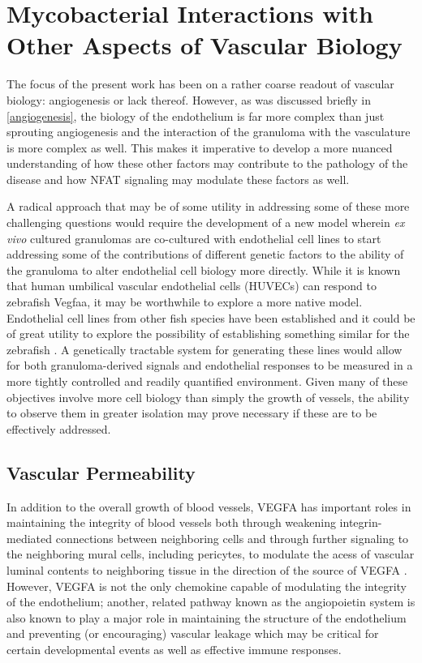 \section{Mycobacterial Interactions with Other Aspects of Vascular Biology}\label{othervasc}

The focus of the present work has been on a rather coarse readout of vascular biology: angiogenesis or lack thereof. However, as was discussed briefly in \autoref{angiogenesis}, the biology of the endothelium is far more complex than just sprouting angiogenesis and the interaction of the granuloma with the vasculature is more complex as well. This makes it imperative to develop a more nuanced understanding of how these other factors may contribute to the pathology of the disease and how NFAT signaling may modulate these factors as well. 

A radical approach that may be of some utility in addressing some of these more challenging questions would require the development of a new model wherein \textit{ex vivo} cultured granulomas are co\hyp{}cultured with endothelial cell lines to start addressing some of the contributions of different genetic factors to the ability of the granuloma to alter endothelial cell biology more directly. While it is known that human umbilical vascular endothelial cells (HUVECs) can respond to zebrafish Vegfaa, it may be worthwhile to explore a more native model. Endothelial cell lines from other fish species have been established and it could be of great utility to explore the possibility of establishing something similar for the zebrafish \citep{Pham2017, Luque2014}. A genetically tractable system for generating these lines would allow for both granuloma\hyp{}derived signals and endothelial responses to be measured in a more tightly controlled and readily quantified environment. Given many of these objectives involve more cell biology than simply the growth of vessels, the ability to observe them in greater isolation may prove necessary if these are to be effectively addressed.

\subsection{Vascular Permeability}\label{permeability}

In addition to the overall growth of blood vessels, VEGFA has important roles in maintaining the integrity of blood vessels both through weakening integrin\hyp{}mediated connections between neighboring cells and through further signaling to the neighboring mural cells, including pericytes, to modulate the acess of vascular luminal contents to neighboring tissue in the direction of the source of VEGFA \citep{ParkWindhol2016, ClaessonWelsh2015}. However, VEGFA is not the only chemokine capable of modulating the integrity of the endothelium; another, related pathway known as the angiopoietin system is also known to play a major role in maintaining the structure of the endothelium and preventing (or encouraging) vascular leakage which may be critical for certain developmental events as well as effective immune responses.

